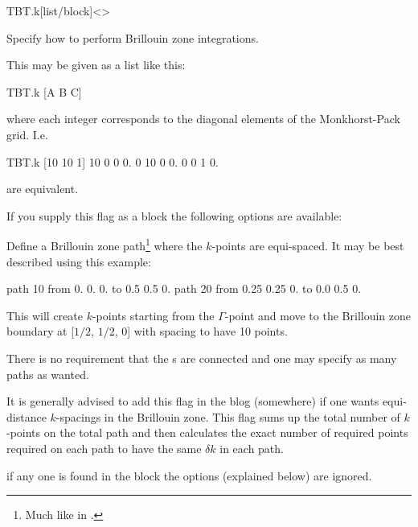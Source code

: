 \begin{fdfentry}{TBT.k}[list/block]<>
  
  Specify how to perform Brillouin zone integrations.

  This may be given as a list like this:
  \begin{fdfexample}
    TBT.k [A B C]
  \end{fdfexample}
  where each integer corresponds to the diagonal elements of the
  Monkhorst-Pack grid. I.e. 
  \begin{fdfexample}
    TBT.k [10 10 1]
      10  0 0 0.
       0 10 0 0.
       0  0 1 0.
  \end{fdfexample}
  are equivalent.


  If you supply this flag as a block the following options are available:
  \begin{fdfoptions}

    \option[path]%
    
    Define a Brillouin zone path\footnote{Much like 
        in \siesta.} where the $k$-points are equi-spaced.
    It may be best described using this example:
    \begin{fdfexample}
  path 10
    from 0.  0.  0.
    to   0.5 0.5 0.
  path 20
    from 0.25 0.25 0.
    to   0.0  0.5  0.
    \end{fdfexample}

    This will create $k$-points starting from the $\Gamma$-point and
    move to the Brillouin zone boundary at [$1/2$, $1/2$, $0$] with
    spacing to have 10 points.

    There is no requirement that the s are
    connected and one may specify as many paths as wanted.

    \begin{fdfoptions}

      It is generally advised to add this flag in the blog
      (somewhere) if one wants equi-distance $k$-spacings in the
      Brillouin zone. This flag sums up the total number of $k$-points
      on the total path and then calculates the exact number of
      required points required on each path to have the same $\delta
      k$ in each path.

    \end{fdfoptions}

    \note if any one  is found in the block the options
    (explained below) are ignored.



\end{fdfoptions}
\end{fdfentry}
